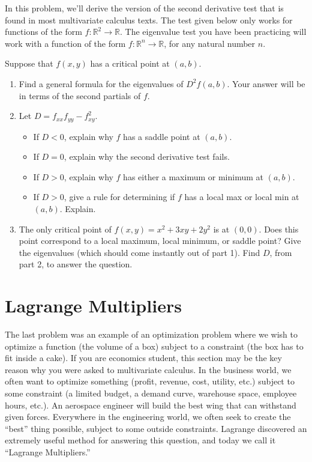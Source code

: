 In this problem, we'll derive the version of the second derivative test that is found in most multivariate calculus texts.  The test given below only works for functions of the form $f:\mathbb{R}^2\to\mathbb{R}$.  The eigenvalue test you have been practicing will work with a function of the form  $f:\mathbb{R}^n\to\mathbb{R}$, for any natural number $n$. 
\begin{problem}[Optional]
 Suppose that $f(x,y)$ has a critical point at $(a,b)$. 
\begin{enumerate}
 \item Find a general formula for the eigenvalues of $D^2f(a,b)$. Your answer will be in terms of the second partials of $f$.
 \item Let $D=f_{xx}f_{yy}-f_{xy}^2$. 
\begin{itemize}
 \item If $D<0$, explain why $f$ has a saddle point at $(a,b)$.
 \item If $D=0$, explain why the second derivative test fails.
 \item If $D>0$, explain why $f$ has either a maximum or minimum at $(a,b)$.
 \item If $D>0$, give a rule for determining if $f$ has a local max or local min at $(a,b)$. Explain.
\end{itemize}
 \item The only critical point of $f(x,y) = x^2+3xy+2y^2$ is at $(0,0)$.  Does this point correspond to a local maximum, local minimum, or saddle point? Give the eigenvalues (which should come instantly out of part 1). Find $D$, from part 2, to answer the question.
\end{enumerate}

\end{problem}

\section{Lagrange Multipliers}
The last problem was an example of an optimization problem where we wish to optimize a function (the volume of a box) subject to a constraint (the box has to fit inside a cake).  If you are economics student, this section may be the key reason why you were asked to multivariate calculus.  In the business world, we often want to optimize something (profit, revenue, cost, utility, etc.) subject to some constraint (a limited budget, a demand curve, warehouse space, employee hours, etc.). An aerospace engineer will build the best wing that can withstand given forces. Everywhere in the engineering world, we often seek to create the ``best'' thing possible, subject to some outside constraints.  Lagrange discovered an extremely useful method for answering this question, and today we call it ``Lagrange Multipliers.''

